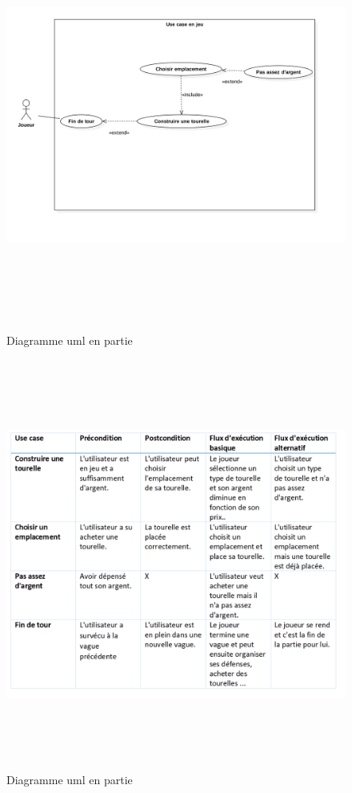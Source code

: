 \documentclass[12pt,a4paper]{article}
\begin{document}
\begin{figure}[H]
\begin{center}
    \includegraphics[height=13.5cm,width=17cm]{ingame_use_case.png}
     \caption{Diagramme uml en partie}   
  \label{fig:picture}
\end{center}
\end{figure}
\begin{figure}[H]
\begin{center}
    \includegraphics[height=13.5cm,width=17cm]{condition2.png}
     \caption{Diagramme uml en partie}   
  \label{fig:picture}
\end{center}
\end{figure}
\end{document}
